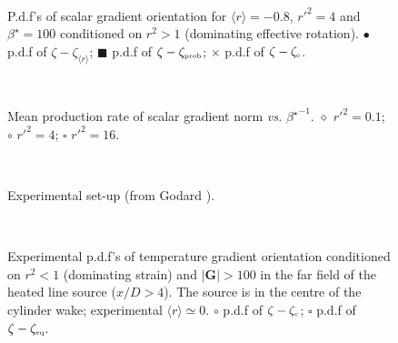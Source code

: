 \documentclass[doublespacing]{elsart}
\begin{document}
\newpage

\begin{figure}[htpb]
\begin{center}
\\
\caption{\label{fig4}
P.d.f's of scalar gradient orientation for
$ \langle r \rangle = -0.8 $, $ r'^2 = 4 $
and $ \beta^{\star} = 100 $
conditioned on $ r^2 > 1 $ (dominating effective rotation).
$ \bullet $ p.d.f of $ \zeta - \zeta_{\langle r \rangle} $;
$ \blacksquare $ p.d.f of $ \zeta - \zeta_{\mbox{\tiny prob}} $;
$ \times $ p.d.f of $ \zeta - \zeta_{\mbox{\tiny c}} $.}
\end{center}
\end{figure}

\newpage

\begin{figure}[htpb]
\begin{center}
\\
\caption{\label{fig5}
Mean production rate of scalar gradient norm
{\em vs.} $ {\beta^{\star}}^{-1} $.
$ \diamond $ $ r'^2 = 0.1 $;
$ \circ $ $ r'^2 = 4 $;
$ \square $ $ r'^2 = 16 $.}
\end{center}
\end{figure}

\newpage

\begin{figure}[htpb]
\begin{center}
\\
\caption{\label{fig6}
Experimental set-up (from Godard \cite{G01}).}
\end{center}
\end{figure}

\newpage

\begin{figure}[htpb]
\begin{center}
\\
\caption{\label{fig7}
Experimental
p.d.f's of temperature gradient orientation
conditioned on $ r^2 < 1 $ (dominating strain)
and $ |\bm{G}| > 100 $ in the far field of
the heated line source ($ x/D > 4 $).
The
source is in the centre of the cylinder wake;
experimental $ \langle r \rangle \simeq 0 $.
$ \circ $ p.d.f of $ \zeta - \zeta_{\mbox{\tiny c}} $;
$ \square $ p.d.f of $ \zeta - \zeta_{\mbox{\tiny eq}} $.}
\end{center}
\end{figure}
\end{document}
